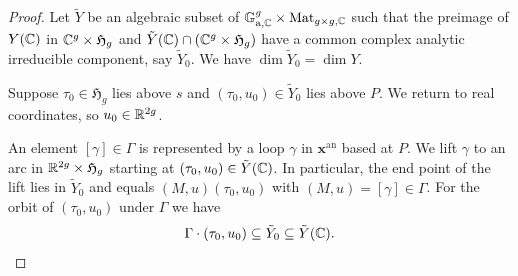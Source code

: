\documentclass[12pt,oneside]{amsart}
\begin{document}
\begin{proof}
  

  Let $\tilde Y$ be an algebraic subset of
  ${\mathbb{G}}_{\mathrm{a},{\mathbb{C}}}^g\times\mathrm{Mat}_{g\times
    g,{\mathbb{C}}}$ such that 
  the preimage of $Y({\mathbb{C}})$ in ${\mathbb{C}}^{g}\times\mathfrak{H}_g$ and 
  $\tilde Y({\mathbb{C}}) \cap
  ({\mathbb{C}}^g\times \mathfrak{H}_g)$ have a common complex analytic
  irreducible component, say $\tilde Y_0$. We have $\dim \tilde Y_0 =
  \dim Y$.

  Suppose $\tau_0\in\mathfrak{H}_g$ lies above $s$ and
  $(\tau_0, u_0)\in \tilde Y_0$ lies above $P$. 
  We return to real coordinates, so $u_0\in{\mathbb{R}}^{2g}$. 

  An element $[\gamma]\in \Gamma$ is represented by a loop $\gamma$ in
  $\mathbf{x}^{\mathrm{an}}$ based at $P$. We lift $\gamma$ to an arc in
  ${\mathbb{R}}^{2g}\times\mathfrak{H}_g$ starting at $(\tau_0,u_0) \in \tilde
  Y({\mathbb{C}})$. %
  In particular, the end point of the lift lies in $\tilde Y_0$ and
  equals $(M,u)(\tau_0,u_0)$ with
  $(M,u)=[\gamma]\in\Gamma$.
  For the orbit of $(\tau_0,u_0)$ under $\Gamma$ we have
  \begin{equation*}
    \Gamma \cdot (\tau_0,u_0)\subseteq \tilde Y_0\subseteq
    \tilde Y({\mathbb{C}}).
  \end{equation*}


  

  

\end{proof}
\end{document}
